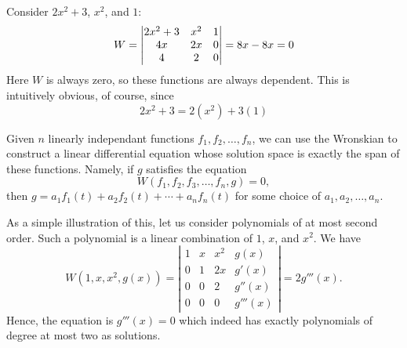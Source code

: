 \documentclass{article}
\begin{document}
Consider $2x^2+3$, $x^2$, and $1$:
\[
W = \left\lvert\begin{array}{@{}ccc@{}}
2x^2 + 3 & x^2 & 1\\
4x & 2x & 0\\
4 & 2 & 0\\
\end{array}\right\rvert = 8x - 8x = 0
\]
Here $W$ is always zero, so these functions are always dependent. This is intuitively obvious, of course, since
\[
2x^2 + 3 = 2(x^2) + 3(1)
\]

Given $n$ linearly independant functions $f_1, f_2, \dotsc, f_n$, we can use 
the Wronskian to construct a linear differential equation whose solution space
is exactly the span of these functions.  Namely, if $g$ satisfies the equation
\[
W(f_1, f_2, f_3, \dotsc, f_n, g) = 0,
\]
then $g = a_1 f_1(t) + a_2 f_2(t) + \dotsb + a_n f_n(t)$ for some choice of
$a_1, a_2, \dotsc, a_n$.

As a simple illustration of this, let us consider polynomials of at most second order.  Such a polynomial is a linear combination of $1$, $x$, and $x^2$.  We
have 
\[ W (1, x, x^2, g(x)) = \left| \begin{matrix} 1 & x & x^2 & g(x) \\
0 & 1 & 2x & g'(x) \\ 0 & 0 & 2 & g''(x) \\ 0 & 0 & 0 & g'''(x)
\end{matrix} \right| = 2 g''' (x) .\]
Hence, the equation is $g''' (x) = 0$ which indeed has exactly polynomials
of degree at most two as solutions.
\end{document}
